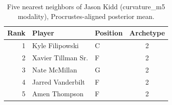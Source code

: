 \begin{table}[htbp]
  \centering\small
  \begin{tabular}{rllc}
    \toprule
    Rank & Player & Position & Archetype \\
    \midrule
    1 & Kyle Filipowski & C & 2 \\
    2 & Xavier Tillman Sr. & F & 2 \\
    3 & Nate McMillan & G & 2 \\
    4 & Jarred Vanderbilt & F & 2 \\
    5 & Amen Thompson & F & 2 \\
    \bottomrule
  \end{tabular}
  \caption{Five nearest neighbors of Jason Kidd (curvature_m5 modality), Procrustes-aligned posterior mean.}
  \label{tab:Jason_Kidd_neighbors_curvature_m5}
\end{table}

